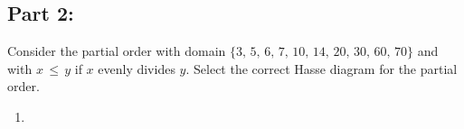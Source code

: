 \documentclass{amsart}
\theoremstyle{definition}
\theoremstyle{Exercise}
\theoremstyle{remark}
\theoremstyle{rule}
\numberwithin{equation}{section}
\begin{document}
\subsection*{Part 2:}
Consider the partial order with domain $\{3,\, 5,\, 6, \,7,\, 10,\, 14,\, 20,\, 30,\, 60,\, 70\}$ and with $x\,\leq \,y$ if $x$ evenly divides $y$. Select the correct Hasse diagram for the partial order.

\begin{enumerate}[label=(\alph*)]
\item
{}
\end{enumerate}
\end{document}
